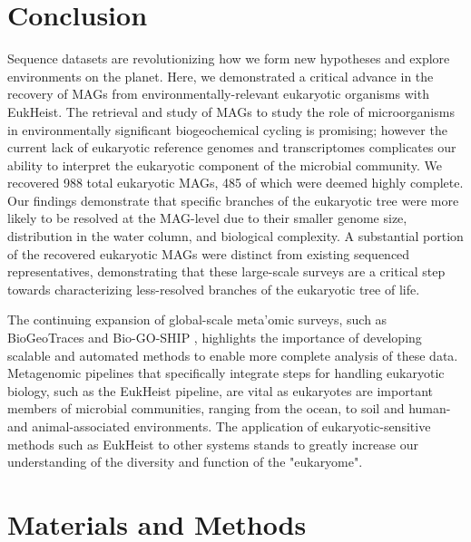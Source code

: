 \documentclass[12pt]{article}
\numberwithin{equation}{section}
\begin{document}
\section*{Conclusion}
Sequence datasets are revolutionizing how we form new hypotheses and explore environments on the planet. Here, we demonstrated a critical advance in the recovery of MAGs from environmentally-relevant eukaryotic organisms with EukHeist. The retrieval and study of MAGs to study the role of microorganisms in environmentally significant biogeochemical cycling is promising; however the current lack of eukaryotic reference genomes and transcriptomes complicates our ability to interpret the eukaryotic component of the microbial community. We recovered 988 total eukaryotic MAGs, 485 of which were deemed highly complete. Our findings demonstrate that specific branches of the eukaryotic tree were more likely to be resolved at the MAG-level due to their smaller genome size, distribution in the water column, and biological complexity. A substantial portion of the recovered eukaryotic MAGs were distinct from existing sequenced representatives, demonstrating that these large-scale surveys are a critical step towards characterizing less-resolved branches of the eukaryotic tree of life. 

The continuing expansion of global-scale meta'omic surveys, such as BioGeoTraces \cite{Biller_2018} and Bio-GO-SHIP \citep{Ustick_2021}, highlights the importance of developing scalable and automated methods to enable more complete analysis of these data. Metagenomic pipelines that specifically integrate steps for handling eukaryotic biology, such as the EukHeist pipeline, are vital as eukaryotes are important members of microbial communities, ranging from the ocean, to soil \citep{bailly2007soil} and human- \citep{Luke__2015} and animal-associated \citep{Campo_2019} environments. The application of eukaryotic-sensitive methods such as EukHeist to other systems stands to greatly increase our understanding of the diversity and function of the "eukaryome".

\section*{Materials and Methods}
\end{document}
